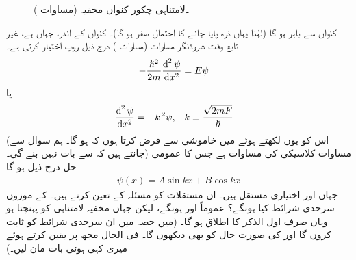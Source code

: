\begin{figure}
\centering
{}
\caption{۔لامتناہی چکور کنواں مخفیہ (مساوات )}
\label{شکل_غیر_تابع_لامتناہی_چکور_کنواں_مخفیہ}
\end{figure}
کنواں سے باہر  ہو گا  (لہٰذا یہاں ذرہ پایا جانے  کا احتمال صفر ہو گا)۔ کنواں کے اندر، جہاں  ہے،  غیر تابع وقت  شروڈنگر مساوات  (مساوات ) درج ذیل روپ اختیار کرتی ہے۔
\begin{align}
-\frac{\hslash^{2}}{2m}\frac{\dif^{\,2}\psi}{\dif x^{2}}&=E\psi
\end{align} 
یا 
\begin{align}\label{مساوات_شروڈنگر_کلاسیکی_ہارمونی_مرتعش}
\frac{\dif^{\,2}\psi}{\dif x^{2}}&=-k^{\,2}\psi, && k\equiv \frac{\sqrt{2mF}}{\hslash}
\end{align}
(اس کو یوں لکھتے ہوئے  میں  خاموشی سے فرض کرتا ہوں کہ  ہو گا۔ ہم  سوال  سے جانتے ہیں کہ  سے بات نہیں بنے گی۔)   مساوات   کلاسیکی  کی مساوات ہے جس کا عمومی حل درج ذیل  ہو گا
\begin{align}
\psi(x)=A\sin kx+B\cos kx
\end{align}
 جہاں   اور   اختیاری مستقل ہیں۔ ان مستقلات کو مسئلہ  کے  تعین کرتے ہیں۔  کے موزوں سرحدی شرائط کیا ہونگے؟ عموماً  اور   ہونگے، لیکن جہاں مخفیہ لامتناہی کو پہنچتا ہو وہاں  صرف اول الذکر کا اطلاق ہو گا۔ (میں حصہ  میں ان سرحدی شرائط کو ثابت کروں گا اور    کی صورت حال کو بھی دیکھوں گا۔ فی الحال مجھ پر یقین کرتے ہوئے میری کہی ہوئی بات مان لیں۔) 

